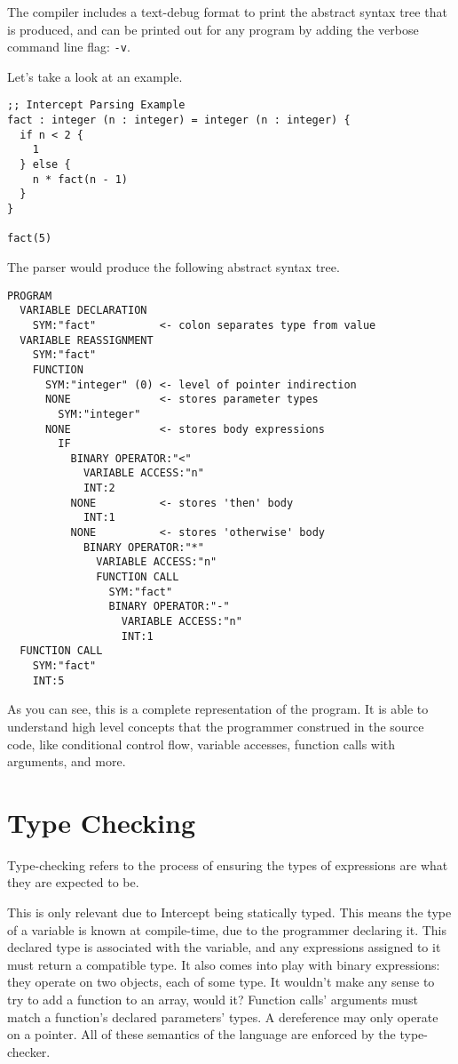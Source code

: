 \documentclass[
12pt,
letterpaper,
oneside,
]{memoir}
\newcommand{\lang}{Intercept
}
\begin{document}
The compiler includes a text-debug format to print the abstract syntax tree that is produced, and can be printed out for any program by adding the verbose command line flag: \verb|-v|.

\filbreak

Let's take a look at an example.
\begin{verbatim}
;; Intercept Parsing Example
fact : integer (n : integer) = integer (n : integer) {
  if n < 2 {
    1
  } else {
    n * fact(n - 1)
  }
}

fact(5)
\end{verbatim}

\filbreak

The parser would produce the following abstract syntax tree.

\begin{verbatim}
PROGRAM
  VARIABLE DECLARATION
    SYM:"fact"          <- colon separates type from value
  VARIABLE REASSIGNMENT
    SYM:"fact"
    FUNCTION
      SYM:"integer" (0) <- level of pointer indirection
      NONE              <- stores parameter types
        SYM:"integer"
      NONE              <- stores body expressions
        IF
          BINARY OPERATOR:"<"
            VARIABLE ACCESS:"n"
            INT:2
          NONE          <- stores 'then' body
            INT:1
          NONE          <- stores 'otherwise' body
            BINARY OPERATOR:"*"
              VARIABLE ACCESS:"n"
              FUNCTION CALL
                SYM:"fact"
                BINARY OPERATOR:"-"
                  VARIABLE ACCESS:"n"
                  INT:1
  FUNCTION CALL
    SYM:"fact"
    INT:5
\end{verbatim}

As you can see, this is a complete representation of the program. It is able to understand high level concepts that the programmer construed in the source code, like conditional control flow, variable accesses, function calls with arguments, and more.

\chapter{Type Checking}

Type-checking refers to the process of ensuring the types of expressions are what they are expected to be.

This is only relevant due to \lang being statically typed. This means the type of a variable is known at compile-time, due to the programmer declaring it. This declared type is associated with the variable, and any expressions assigned to it must return a compatible type. It also comes into play with binary expressions: they operate on two objects, each of some type. It wouldn't make any sense to try to add a function to an array, would it? Function calls' arguments must match a function's declared parameters' types. A dereference may only operate on a pointer. All of these semantics of the language are enforced by the type-checker.
\end{document}
